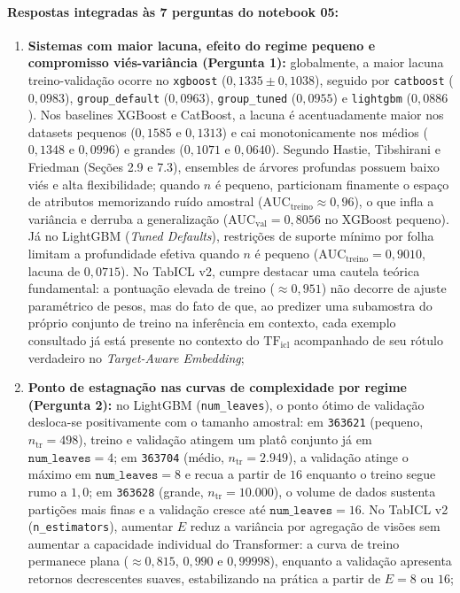 \documentclass[11pt,a4paper]{article}
\begin{document}
\paragraph{Respostas integradas às 7 perguntas do notebook 05:}
\begin{enumerate}[leftmargin=2em]
    \item \textbf{Sistemas com maior lacuna, efeito do regime pequeno e compromisso viés-variância (Pergunta 1):} globalmente, a maior lacuna treino-validação ocorre no \texttt{xgboost} ($0{,}1335 \pm 0{,}1038$), seguido por \texttt{catboost} ($0{,}0983$), \texttt{group\_default} ($0{,}0963$), \texttt{group\_tuned} ($0{,}0955$) e \texttt{lightgbm} ($0{,}0886$). Nos baselines XGBoost e CatBoost, a lacuna é acentuadamente maior nos datasets pequenos ($0{,}1585$ e $0{,}1313$) e cai monotonicamente nos médios ($0{,}1348$ e $0{,}0996$) e grandes ($0{,}1071$ e $0{,}0640$). Segundo Hastie, Tibshirani e Friedman \cite{hastie2009elements} (Seções 2.9 e 7.3), ensembles de árvores profundas possuem baixo viés e alta flexibilidade; quando $n$ é pequeno, particionam finamente o espaço de atributos memorizando ruído amostral ($\text{AUC}_{\mathrm{treino}} \approx 0{,}96$), o que infla a variância e derruba a generalização ($\text{AUC}_{\mathrm{val}} = 0{,}8056$ no XGBoost pequeno). Já no LightGBM (\emph{Tuned Defaults}), restrições de suporte mínimo por folha limitam a profundidade efetiva quando $n$ é pequeno ($\text{AUC}_{\mathrm{treino}} = 0{,}9010$, lacuna de $0{,}0715$). No TabICL v2, cumpre destacar uma cautela teórica fundamental: a pontuação elevada de treino ($\approx 0{,}951$) não decorre de ajuste paramétrico de pesos, mas do fato de que, ao predizer uma subamostra do próprio conjunto de treino na inferência em contexto, cada exemplo consultado já está presente no contexto do $\mathrm{TF}_{\mathrm{icl}}$ acompanhado de seu rótulo verdadeiro no \emph{Target-Aware Embedding};
    \item \textbf{Ponto de estagnação nas curvas de complexidade por regime (Pergunta 2):} no LightGBM (\texttt{num\_leaves}), o ponto ótimo de validação desloca-se positivamente com o tamanho amostral: em \texttt{363621} (pequeno, $n_{\mathrm{tr}} = 498$), treino e validação atingem um platô conjunto já em $\texttt{num\_leaves} = 4$; em \texttt{363704} (médio, $n_{\mathrm{tr}} = 2.949$), a validação atinge o máximo em $\texttt{num\_leaves} = 8$ e recua a partir de $16$ enquanto o treino segue rumo a $1{,}0$; em \texttt{363628} (grande, $n_{\mathrm{tr}} = 10.000$), o volume de dados sustenta partições mais finas e a validação cresce até $\texttt{num\_leaves} = 16$. No TabICL v2 (\texttt{n\_estimators}), aumentar $E$ reduz a variância por agregação de visões sem aumentar a capacidade individual do Transformer: a curva de treino permanece plana ($\approx 0{,}815$, $0{,}990$ e $0{,}99998$), enquanto a validação apresenta retornos decrescentes suaves, estabilizando na prática a partir de $E = 8$ ou $16$;

\end{enumerate}
\end{document}
